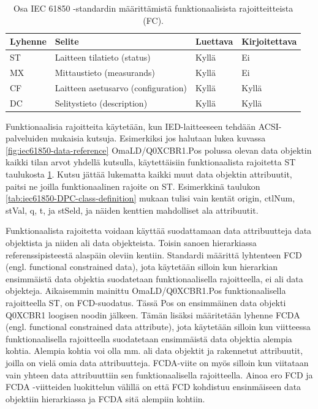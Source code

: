 \begin{table}[ht!]
	\caption{Osa IEC 61850 -standardin määrittämistä funktionaalisista rajoitteitteista (FC).}
	\label{tab:iec61850-functional-constraints}
	\begin{tabular}{l | l | l | l}
		\hline
		\textbf{Lyhenne} & \textbf{Selite} & \textbf{Luettava} & \textbf{Kirjoitettava} \\
		\hline \hline
		ST & Laitteen tilatieto (status) & Kyllä & Ei \\
		MX & Mittaustieto (measurands) & Kyllä & Ei \\
		CF & Laitteen asetusarvo (configuration) & Kyllä & Kyllä \\
		DC & Selitystieto (description) & Kyllä & Kyllä \\
		\hline
	\end{tabular}
\end{table}

Funktionaalisia rajoitteita käytetään, kun IED-laitteeseen tehdään ACSI-palveluiden mukaisia kutsuja. Esimerkiksi jos halutaan lukea kuvassa \ref{fig:iec61850-data-reference} OmaLD/Q0XCBR1.Pos polussa olevan data objektin kaikki tilan arvot yhdellä kutsulla, käytettäisiin funktionaalista rajoitetta ST taulukosta \ref{tab:iec61850-functional-constraints}. Kutsu jättää lukematta kaikki muut data objektin attribuutit, paitsi ne joilla funktionaalinen rajoite on ST. Esimerkkinä taulukon \ref{tab:iec61850-DPC-class-definition} mukaan tulisi vain kentät origin, ctlNum, stVal, q, t, ja stSeld, ja näiden kenttien mahdolliset ala attribuutit.

Funktionaalista rajoitetta voidaan käyttää suodattamaan data attribuutteja data objektista ja niiden ali data objekteista. Toisin sanoen hierarkiassa referenssipisteestä alaspäin oleviin kentiin. Standardi määrittä lyhtenteen FCD (engl. functional constrained data), jota käytetään silloin kun hierarkian ensimmäistä data objektia suodatetaan funktionaalisella rajoitteella, ei ali data objekteja. Aikaisemmin mainittu OmaLD/Q0XCBR1.Pos funktionaalisella rajoitteella ST, on FCD-suodatus. Tässä Pos on ensimmäinen data objekti Q0XCBR1 loogisen noodin jälkeen. Tämän lisäksi määritetään lyhenne FCDA (engl. functional constrained data attribute), jota käytetään silloin kun viitteessa funktionaalisella rajoitteella suodatetaan ensimmäistä data objektia alempia kohtia. Alempia kohtia voi olla mm. ali data objektit ja rakennetut attribuutit, joilla on vielä omia data attribuutteja. FCDA-viite on myös silloin kun viitataan vain yhteen data attribuuttiin sen funktionaalisella rajoitteella. Ainoa ero FCD ja FCDA -viitteiden luokittelun välillä on että FCD kohdistuu ensinmäiseen data objektiin hierarkiassa ja FCDA sitä alempiin kohtiin. \cite[s.~55]{IEC61850-7-2} \cite[s.~63]{IEC61850-8-1}


